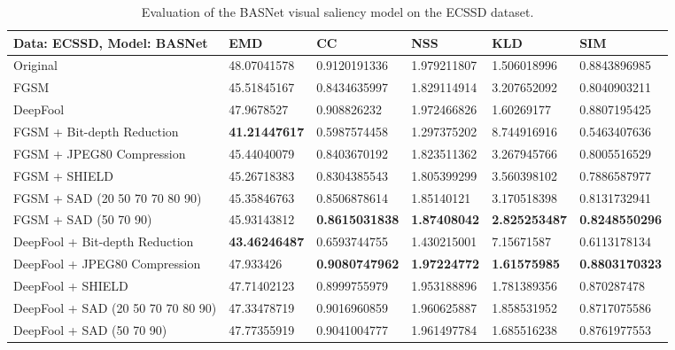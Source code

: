 \documentclass[10pt,twocolumn,letterpaper]{article}
\begin{document}
\begin{table*}[hbt]
\begin{tabular}{l|l|l|l|l|l}
Data: \textbf{ECSSD}, Model: \textbf{BASNet}                   & EMD         & CC           & NSS         & KLD         & SIM  \\
\hline
Original                          & 48.07041578 & 0.9120191336 & 1.979211807 & 1.506018996 & 0.8843896985 \\
\hline
FGSM                           & 45.51845167 & 0.8434635997 & 1.829114914 & 3.207652092 & 0.8040903211 \\
DeepFool                       & 47.9678527  & 0.908826232  & 1.972466826 & 1.60269177  & 0.8807195425 \\
\hline
FGSM + Bit-depth Reduction     & \textbf{41.21447617} & 0.5987574458 & 1.297375202 & 8.744916916 & 0.5463407636 \\
FGSM + JPEG80 Compression      & 45.44040079 & 0.8403670192 & 1.823511362 & 3.267945766 & 0.8005516529 \\
FGSM + SHIELD                  & 45.26718383 & 0.8304385543 & 1.805399299 & 3.560398102 & 0.7886587977 \\
FGSM + SAD (20 50 70 70 80 90)            & 45.35846763 & 0.8506878614 & 1.85140121  & 3.170518398 & 0.8131732941 \\
FGSM + SAD (50 70 90)            & 45.93143812 & \textbf{0.8615031838} & \textbf{1.87408042}  & \textbf{2.825253487} & \textbf{0.8248550296} \\
\hline
DeepFool + Bit-depth Reduction & \textbf{43.46246487} & 0.6593744755 & 1.430215001 & 7.15671587  & 0.6113178134 \\
DeepFool + JPEG80 Compression  & 47.933426   & \textbf{0.9080747962} & \textbf{1.97224772}  & \textbf{1.61575985}  & \textbf{0.8803170323} \\
DeepFool + SHIELD              & 47.71402123 & 0.8999755979 & 1.953188896 & 1.781389356 & 0.870287478  \\
DeepFool + SAD (20 50 70 70 80 90)        & 47.33478719 & 0.9016960859 & 1.960625887 & 1.858531952 & 0.8717075586 \\
DeepFool + SAD (50 70 90)        & 47.77355919 & 0.9041004777 & 1.961497784 & 1.685516238 & 0.8761977553
\end{tabular}
  \caption{Evaluation of the BASNet\cite{BASNet} visual saliency model\cite{BASNet} on the ECSSD\cite{ECSSD} dataset.}
  \label{table:results_ecssd_basnet}
\end{table*}
\end{document}
